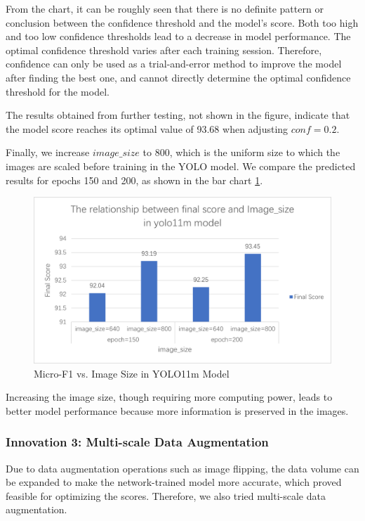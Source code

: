 From the chart, it can be roughly seen that there is no definite pattern or conclusion between the confidence threshold and the model's score. Both too high and too low confidence thresholds lead to a decrease in model performance. The optimal confidence threshold varies after each training session. Therefore, confidence can only be used as a trial-and-error method to improve the model after finding the best one, and cannot directly determine the optimal confidence threshold for the model.

The results obtained from further testing, not shown in the figure, indicate that the model score reaches its optimal value of 93.68 when adjusting $conf = 0.2$.

Finally, we increase $image\_size$ to 800, which is the uniform size to which the images are scaled before training in the YOLO model. We compare the predicted results for epochs 150 and 200, as shown in the bar chart \cref{fig:yolo-size}.
\begin{figure}[t]
  \centering
  \includegraphics[width=0.8\linewidth]{./graphs/图片11.png}

  \caption{Micro-F1 vs. Image Size in YOLO11m Model}
  \label{fig:yolo-size}
\end{figure}

Increasing the image size, though requiring more computing power, leads to better model performance because more information is preserved in the images.

\subsubsection{Innovation 3: Multi-scale Data Augmentation}

Due to data augmentation operations such as image flipping, the data volume can be expanded to make the network-trained model more accurate\cite{sym11101223}, which proved feasible for optimizing the scores. Therefore, we also tried multi-scale data augmentation.


